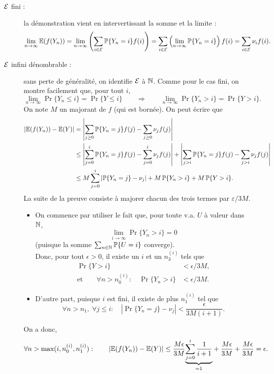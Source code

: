 \proof 
\begin{description}
  \item[$\mathcal{E}$ fini :] la démonstration vient en intervertissant la somme et la limite : 
  $$
  \lim_{n \to \infty} \operatorname{\mathbb{E}}(f(Y_n)) 
  = \lim_{n \to \infty} \left(\sum_{i \in \mathcal{E}} \operatorname{\mathbb{P}}\{Y_n = i\} f(i)\right)
  = \sum_{i \in \mathcal{E}} \left(\lim_{n \to \infty} \operatorname{\mathbb{P}}\{Y_n = i\} \right) f(i) 
  = \sum_{i \in \mathcal{E}} \nu_i f(i).
  $$
  \item[$\mathcal{E}$ infini dénombrable :] sans perte de généralité, on identifie $\mathcal{E}$ à $\mathbb{N}$. Comme pour le cas fini, on montre facilement que, pour tout $i$,
  $$
  \lim_{n \to \infty} \Pr\{Y_n \leq i\} = \Pr\{Y \leq i\}
  \qquad \Rightarrow \qquad 
  \lim_{n \to \infty} \Pr\{Y_n > i\} = \Pr\{Y > i\}.
  $$
  On note $M$ un majorant de $f$ (qui est bornée). On peut écrire que
  \begin{align*}
    \left|\operatorname{\mathbb{E}}(f(Y_n)) - \operatorname{\mathbb{E}}(Y)\right|
    & = \left|\sum_{j \geq 0} \operatorname{\mathbb{P}}\{Y_n=j\} f(j) - \sum_{j \geq 0} \nu_j f(j)\right| \\
    & \leq \left|\sum_{j=0}^i \operatorname{\mathbb{P}}\{Y_n=j\} f(j) - \sum_{j=0}^i \nu_j f(j)\right|
    + \left|\sum_{j > i} \operatorname{\mathbb{P}}\{Y_n=j\} f(j) - \sum_{j > i} \nu_j f(j)\right| \\
    & \leq M \sum_{j=0}^i \left|\operatorname{\mathbb{P}}\{Y_n=j\} - \nu_j\right| + M \operatorname{\mathbb{P}}\{Y_n > i\} + M \operatorname{\mathbb{P}}\{Y > i\}.
  \end{align*}
  La suite de la preuve consiste à majorer chacun des trois termes par $\varepsilon/3M$. 
  \begin{itemize}
  \item On commence par utiliser le fait que, pour toute v.a. $U$ à valeur dans $\mathbb{N}$, 
  $$
  \lim_{i \to \infty} \Pr\{Y_n > i\} = 0
  $$
  (puisque la somme $\sum_{n \in \mathbb{N}} \operatorname{\mathbb{P}}\{U = i\}$ converge). \\
  Donc, pour tout $\epsilon > 0$, il existe un $i$ et un $n_3^{(i)}$ tels que 
  \begin{align*}
  \Pr\{Y > i\} & < \epsilon / 3M, \\
  \text{et} \qquad 
  \forall n > n_0^{(i)}: \quad \Pr\{Y_n > i\} & < \epsilon / 3M.
  \end{align*}
  \item D'autre part, puisque $i$ est fini, il existe de plus $n_1^{(i)}$ tel que 
  $$
  \forall n > n_1, \; \forall j \leq i: \quad \left|\Pr\{Y_n=j\} - \nu_j\right| < \frac\epsilon{3M(i+1)}.
  $$
  \end{itemize}
  On a donc, 
 \begin{align*}
   \forall n > \max(i, n_0^{(i)}, n_1^{(i)}): \qquad 
   \left|\operatorname{\mathbb{E}}(f(Y_n)) - \operatorname{\mathbb{E}}(Y)\right| \leq \frac{M\epsilon}{3M} \underset{=1}{\underbrace{\sum_{j=0}^i \frac1{i+1}}} + \frac{M\epsilon}{3M} + \frac{M\epsilon}{3M} = \epsilon.
  \end{align*}
\end{description}
\eproof

